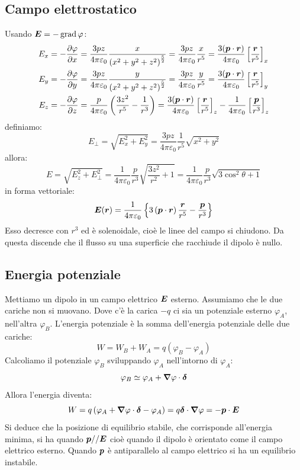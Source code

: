 \subsection{Campo elettrostatico}
Usando $\boldsymbol{E}=-\operatorname{grad}\varphi$:
\begin{align}
  \label{eq:E_dipolo}
  E_x & =-\frac{\partial\varphi}{\partial x}=\frac{3pz}{4\pi\varepsilon_0}\frac{x}{\left(x^2+y^2+z^2\right)^\frac{5}{2}}=\frac{3pz}{4\pi\varepsilon_0}\frac{x}{r^5}=\frac{3(\boldsymbol{p}\cdot \boldsymbol{r})}{4\pi\varepsilon_0}\left[\frac{\boldsymbol{r}}{r^5}\right]_x \\
  E_y & =-\frac{\partial\varphi}{\partial y}=\frac{3pz}{4\pi\varepsilon_0}\frac{y}{\left(x^2+y^2+z^2\right)^\frac{5}{2}}=\frac{3pz}{4\pi\varepsilon_0}\frac{y}{r^5}=\frac{3(\boldsymbol{p}\cdot \boldsymbol{r})}{4\pi\varepsilon_0}\left[\frac{\boldsymbol{r}}{r^5}\right]_y \\
  E_z & =-\frac{\partial\varphi}{\partial z}=\frac{p}{4\pi\varepsilon_0}\left(\frac{3z^2}{r^5}-\frac{1}{r^3}\right)=\frac{3(\boldsymbol{p}\cdot \boldsymbol{r})}{4\pi\varepsilon_0}\left[\frac{\boldsymbol{r}}{r^5}\right]_z-\frac{1}{4\pi\varepsilon_0}\left[\frac{\boldsymbol{p}}{r^3}\right]_z
\end{align}
definiamo:
\[E_\perp=\sqrt{E_x^2+E_y^2}=\frac{3pz}{4\pi\varepsilon_0}\frac{1}{r^{5}}\sqrt{x^2+y^2}\]
allora:
\[E=\sqrt{E_z^2+E_\perp^2}=\frac{1}{4\pi\varepsilon_0}\frac{p}{r^3}\sqrt{\frac{3z^2}{r^2}+1}=\frac{1}{4\pi\varepsilon_0}\frac{p}{r^3}\sqrt{3\cos^2\theta+1}\]
in forma vettoriale:
\begin{equation}
  \label{eq:campo_dipolo}
  \boldsymbol{E}(\boldsymbol{r})=\frac{1}{4\pi\varepsilon_0}\left\{3\left(\boldsymbol{p}\cdot\boldsymbol{r}\right)\frac{\boldsymbol{r}}{r^5}-\frac{\boldsymbol{p}}{r^3}\right\}\end{equation}
Esso decresce con $r^3$ ed è solenoidale, cioè le linee del campo si chiudono. Da questa discende che il flusso su una superficie che racchiude il dipolo è nullo.
\subsection{Energia potenziale}
Mettiamo un dipolo in un campo elettrico $\boldsymbol{E}$ esterno. Assumiamo che le due cariche non si muovano. Dove c'è la carica $-q$ ci sia un potenziale esterno $\varphi_A$, nell'altra $\varphi_B$. L'energia potenziale è la somma dell'energia potenziale delle due cariche:
\[W=W_B+W_A=q(\varphi_B-\varphi_A)\]
Calcoliamo il potenziale $\varphi_B$ sviluppando $\varphi_A$ nell'intorno di $\varphi_A$:
\[\varphi_B\simeq\varphi_A+\boldsymbol{\nabla}\varphi\cdot\boldsymbol{\delta}\]
Allora l'energia diventa:
\[W=q\left(\varphi_A+\boldsymbol{\nabla}\varphi\cdot\boldsymbol{\delta}-\varphi_A\right)=q\boldsymbol{\delta}\cdot\boldsymbol{\nabla}\varphi=-\boldsymbol{p}\cdot\boldsymbol{E}\]
Si deduce che la posizione di equilibrio stabile, che corrisponde all'energia minima, si ha quando $\boldsymbol{p}//\boldsymbol{E}$ cioè quando il dipolo è orientato come il campo elettrico esterno. Quando $\boldsymbol{p}$ è antiparallelo al campo elettrico si ha un equilibrio instabile.
